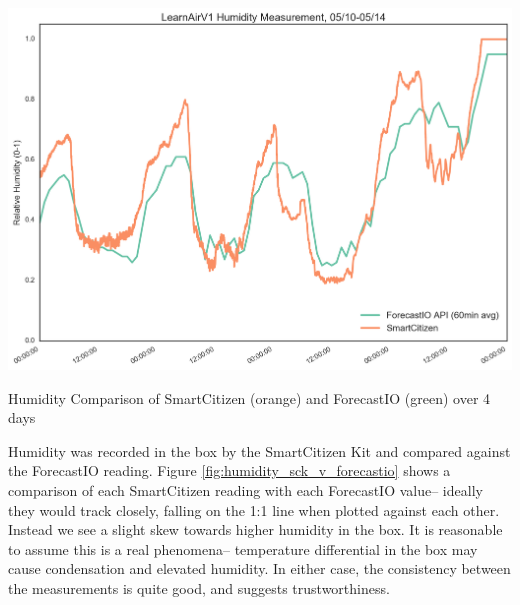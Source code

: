 \begin{marginfigure}[5cm]
 	\includegraphics[width=\textwidth]{figs/humidity_zoomed}               
 	 \caption{Humidity Comparison of SmartCitizen (orange) and ForecastIO (green) over 4 days}
  	\label{fig:humidity_zoomed}
\end{marginfigure}

Humidity was recorded in the box by the SmartCitizen Kit and compared against the ForecastIO reading.  Figure \ref{fig:humidity_sck_v_forecastio} shows a comparison of each SmartCitizen reading with each ForecastIO value-- ideally they would track closely, falling on the 1:1 line when plotted against each other.  Instead we see a slight skew towards higher humidity in the box.  It is reasonable to assume this is a real phenomena-- temperature differential in the box may cause condensation and elevated humidity.  In either case, the consistency between the measurements is quite good, and suggests trustworthiness. 

